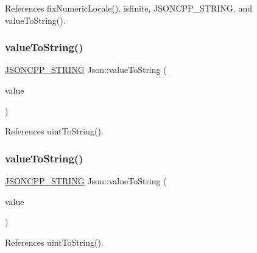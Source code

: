 References fix\+Numeric\+Locale(), isfinite, J\+S\+O\+N\+C\+P\+P\+\_\+\+S\+T\+R\+I\+NG, and value\+To\+String().

\mbox{\label{namespaceJson_a4732517cb28d203cfd4354d05952a81b_a4732517cb28d203cfd4354d05952a81b}} 
\subsubsection{\texorpdfstring{value\+To\+String()}{valueToString()}\hspace{0.1cm}{\footnotesize\ttfamily [3/6]}}
{\footnotesize\ttfamily \hyperlink{json_8h_a1e723f95759de062585bc4a8fd3fa4be_a1e723f95759de062585bc4a8fd3fa4be}{J\+S\+O\+N\+C\+P\+P\+\_\+\+S\+T\+R\+I\+NG} Json\+::value\+To\+String (\begin{DoxyParamCaption}\item[{\hyperlink{namespaceJson_a218d880af853ce786cd985e82571d297_a218d880af853ce786cd985e82571d297}{Largest\+Int}}]{value }\end{DoxyParamCaption})}



References uint\+To\+String().

\mbox{\label{namespaceJson_a6283ea3db02efe9104ae6baff698245a_a6283ea3db02efe9104ae6baff698245a}} 
\subsubsection{\texorpdfstring{value\+To\+String()}{valueToString()}\hspace{0.1cm}{\footnotesize\ttfamily [4/6]}}
{\footnotesize\ttfamily \hyperlink{json_8h_a1e723f95759de062585bc4a8fd3fa4be_a1e723f95759de062585bc4a8fd3fa4be}{J\+S\+O\+N\+C\+P\+P\+\_\+\+S\+T\+R\+I\+NG} Json\+::value\+To\+String (\begin{DoxyParamCaption}\item[{\hyperlink{namespaceJson_ae202ecad69725e23443f465e257456d0_ae202ecad69725e23443f465e257456d0}{Largest\+U\+Int}}]{value }\end{DoxyParamCaption})}



References uint\+To\+String().

